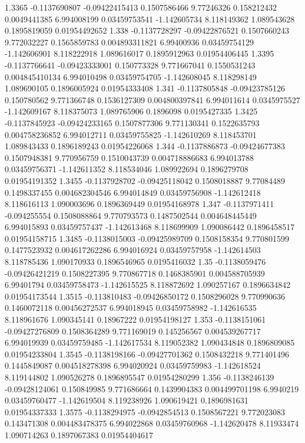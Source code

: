 {1.3365 -0.1137690807 -0.09422415413 0.1507586466 9.77246326 0.158212432 0.0049441385 6.994008199 0.03459753541 -1.142605734 8.118149362 1.089543628 0.1895819059 0.01954492652
1.338 -0.1137728297 -0.09422876521 0.1507660243 9.772032227 0.1565859783 0.004893311821 6.99400936 0.03459754129 -1.142606901 8.118222918 1.089616017 0.1895912963 0.01954406445
1.3395 -0.1137766641 -0.09423333001 0.150773328 9.771667041 0.1550531243 0.004845410134 6.994010498 0.03459754705 -1.142608045 8.118298149 1.089690105 0.1896005924 0.01954333408
1.341 -0.1137805848 -0.09423785126 0.150780562 9.771366748 0.1536127309 0.004800397841 6.994011614 0.0345975527 -1.142609167 8.118375073 1.089765906 0.1896098 0.0195427335
1.3425 -0.1137845923 -0.09424233165 0.1507877306 9.771130341 0.1522635793 0.004758236852 6.994012711 0.03459755825 -1.142610269 8.118453701 1.089843433 0.1896189243 0.01954226068
1.344 -0.1137886873 -0.09424677383 0.1507948381 9.770956759 0.1510043739 0.004718886683 6.994013788 0.03459756371 -1.142611352 8.118534046 1.089922694 0.1896279708 0.01954191352
1.3455 -0.1137928702 -0.09425118042 0.1508018887 9.77084489 0.1498337455 0.004682304546 6.994014849 0.03459756908 -1.142612418 8.118616113 1.090003696 0.1896369449 0.01954168978
1.347 -0.1137971411 -0.094255554 0.1508088864 9.770793573 0.1487502544 0.004648445449 6.994015893 0.03459757437 -1.142613468 8.118699909 1.090086442 0.1896458517 0.01954158715
1.3485 -0.1138015003 -0.09425989709 0.1508158354 9.770801599 0.1477523932 0.004617262286 6.994016924 0.03459757958 -1.142614503 8.118785436 1.090170933 0.1896546965 0.0195416032
1.35 -0.1138059476 -0.09426421219 0.1508227395 9.770867718 0.1468385901 0.004588705939 6.99401794 0.03459758473 -1.142615525 8.118872692 1.090257167 0.1896634842 0.01954173544
1.3515 -0.113810483 -0.09426850172 0.1508296028 9.770990636 0.1460072118 0.00456272537 6.994018945 0.03459758982 -1.142616535 8.118961676 1.090345141 0.18967222 0.01954198127
1.353 -0.1138151061 -0.09427276809 0.1508364289 9.771169019 0.145256567 0.004539267717 6.994019939 0.03459759485 -1.142617534 8.119052382 1.090434848 0.1896809085 0.01954233804
1.3545 -0.1138198166 -0.09427701362 0.1508432218 9.771401496 0.1445849087 0.004518278398 6.994020924 0.03459759983 -1.142618524 8.119144802 1.090526278 0.1896895547 0.01954280299
1.356 -0.1138246139 -0.09428124061 0.150849985 9.771686664 0.1439904383 0.004499701198 6.9940219 0.03459760477 -1.142619504 8.119238926 1.090619421 0.1896981631 0.01954337333
1.3575 -0.1138294975 -0.0942854513 0.1508567221 9.772023083 0.143471308 0.004483478375 6.994022868 0.03459760968 -1.142620478 8.11933474 1.090714263 0.1897067383 0.01954404617
}
